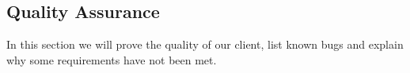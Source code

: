 \subsection{Quality Assurance}
In this section we will prove the quality of our client, list known bugs and explain why some requirements have not been met.



\newpage
